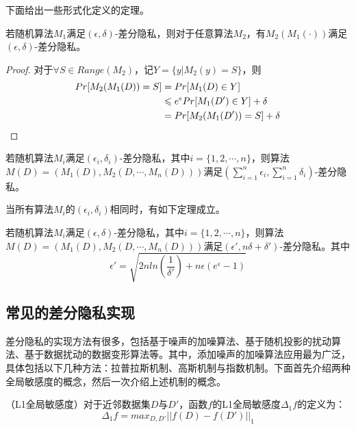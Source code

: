 下面给出一些形式化定义的定理。

\begin{theorem}
	若随机算法$M_1$满足$(\epsilon, \delta)$-差分隐私，则对于任意算法$M_2$，有$M_2(M_1(\cdot))$满足$(\epsilon, \delta)$-差分隐私。
\end{theorem}

\begin{proof}
	对于$\forall S\in Range(M_2)$，记$Y=\{y|M_2(y)=S\}$，则
	\begin{align}
	Pr[M_2(M_1(D))=S]&=Pr[M_1(D)\in Y]\notag\\
	&\leq e^\epsilon Pr[M_1(D')\in Y]+\delta\notag\\
	&=Pr[M_2(M_1(D'))=S]+\delta\notag
	\end{align}
\end{proof}

\begin{theorem}
	若随机算法$M_i$满足$(\epsilon_i, \delta_i)$-差分隐私，其中$i=\{1,2,\cdots,n\}$，则算法$M(D)=(M_1(D),M_2(D,\cdots,M_n(D)))$满足$(\sum_{i=1}^{n}\epsilon_i, \sum_{i=1}^{n}\delta_i)$-差分隐私\cite{Algorithmic_Foundations_of_DP}。
\end{theorem}

当所有算法$M_i$的$(\epsilon_i, \delta_i)$相同时，有如下定理成立。

\begin{theorem}
	若随机算法$M_i$满足$(\epsilon, \delta)$-差分隐私，其中$i=\{1,2,\cdots,n\}$，则算法$M(D)=(M_1(D),M_2(D,\cdots,M_n(D)))$满足$(\epsilon', n\delta+\delta')$-差分隐私\cite{Algorithmic_Foundations_of_DP}。其中
		$$\epsilon'=\sqrt{2nln(\frac{1}{\delta'})+n\epsilon(e^\epsilon-1)}$$
\end{theorem}


\subsection{常见的差分隐私实现}

差分隐私的实现方法有很多，包括基于噪声的加噪算法、基于随机投影的扰动算法、基于数据扰动的数据变形算法等。其中，添加噪声的加噪算法应用最为广泛，具体包括以下几种方法：拉普拉斯机制\cite{LaplaceM}、高斯机制\cite{Algorithmic_Foundations_of_DP}与指数机制\cite{Mechanism_DP}。下面首先介绍两种全局敏感度的概念，然后一次介绍上述机制的概念。

\begin{definition}
	（L1全局敏感度\cite{Algorithmic_Foundations_of_DP}）对于近邻数据集$D$与$D'$，函数$f$的L1全局敏感度$\Delta_1f$的定义为：
	\begin{equation}
		\Delta_1f=max_{D,D'}||f(D)-f(D')||_1
	\end{equation}
\end{definition}

